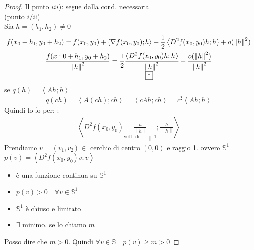 \documentclass[a4paper, oneside]{article}
\begin{document}
        \begin{proof}
            Il punto $iii)$: segue dalla cond. necessaria\\
            (punto $i/ii$)\\
            Sia $h = (h_1,h_2) \neq 0$\\
            \begin{gather*}
                f(x_0+h_1,y_0+h_2) = f(x_0,y_0) + \left\langle \nabla f(x_0,y_0); h \right\rangle  + \frac{1}{2} \left\langle D^2 f(x_0,y_0)h;h\right\rangle +o(\left\lVert h\right\rVert^2 )\\
                \frac{f(x:0+h_1,y_0+h_2)}{\left\lVert h\right\rVert^2 } =  \underset{\text{\fbox{*}}}{\frac{1}{2} \frac{\left\langle D^2 f(x_0,y_0)h;h\right\rangle}{\left\lVert h\right\rVert^2 }} +\frac{o(\left\lVert h\right\rVert^2 )}{\left\lVert h\right\rVert^2 }\\ 
            \end{gather*}
            se $q(h) = \left\langle Ah;h\right\rangle $\\
            \begin{gather*}
                q(ch) = \left\langle A(ch) ; ch\right\rangle = \left\langle cAh;ch\right\rangle = c^2\left\langle Ah;h\right\rangle   
            \end{gather*}
            Quindi lo fo per: \fbox{*}:
            \begin{gather*}
                \left\langle D^2f(x_0,y_0) \underset{\text{vett. di $\left\lVert \cdot \right\rVert$ 1}}{\frac{h}{\left\lVert h\right\rVert }}; \frac{h}{\left\lVert h\right\rVert }\right\rangle 
            \end{gather*}
            Prendiamo $v = (v_1,v_2) \in$ cerchio di centro $(0,0)$ e raggio 1. ovvero $\mathbb{S}^1$\\
            $p(v) = \left\langle D^2f(x_0,y_0)v;v\right\rangle $\\
            \begin{itemize}
                \item è una funzione continua su $\mathbb{S}^1$
                \item $p(v) > 0 \quad \forall v \in \mathbb{S}^1$
                \item $\mathbb{S}^1$ è chiuso e limitato
                \item $\exists$ minimo. se lo chiamo $m$
            \end{itemize}
            Posso dire che $m>0$. Quindi $\forall v \in \mathbb{S} \quad p(v) \geq m > 0$

\end{proof}
\end{document}
